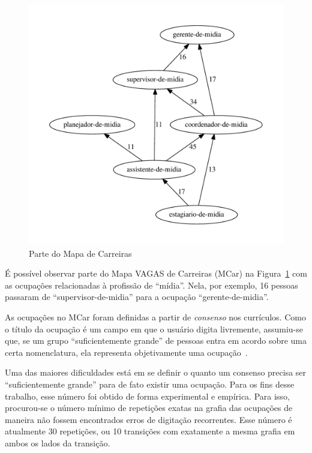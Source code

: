 \documentclass[
  article,
  11pt,
  a4paper,
  english,
  brazil,
  sumario=tradicional]{abntex2}
\begin{document}
\begin{figure}[ht]
  \centering
  \includegraphics[scale=0.6]{cluster_23.pdf}
  \caption{Parte do Mapa de Carreiras}
  \label{fig:ex-mapa-midia}
\end{figure}

É possível observar parte do Mapa VAGAS de Carreiras (MCar) na Figura~\ref{fig:ex-mapa-midia} com as ocupações relacionadas à profissão de \enquote{mídia}. Nela, por exemplo, 16 pessoas passaram de \enquote{supervisor-de-midia} para a ocupação \enquote{gerente-de-midia}.

As ocupações no MCar foram definidas a partir de \textit{consenso} nos currículos. Como o título da ocupação é um campo em que o usuário digita livremente, assumiu-se que, se um grupo \enquote{suficientemente grande} de pessoas entra em acordo sobre uma certa nomenclatura, ela representa objetivamente uma ocupação~\cite{Gunz2007-hr}.

Uma das maiores dificuldades está em se definir o quanto um consenso precisa ser \enquote{suficientemente grande} para de fato existir uma ocupação. Para os fins desse trabalho, esse número foi obtido de forma experimental e empírica. Para isso, procurou-se o número mínimo de repetições exatas na grafia das ocupações de maneira não fossem encontrados erros de digitação recorrentes. Esse número é atualmente 30 repetições, ou 10 transições com exatamente a mesma grafia em ambos os lados da transição.
\end{document}
